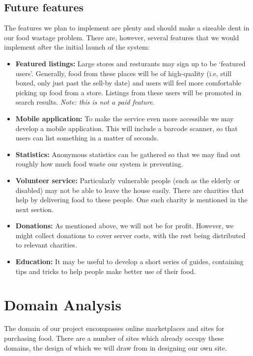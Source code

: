 \documentclass[12pt]{article}
\begin{document}
\subsection{Future features}
The features we plan to implement are plenty and should make a sizeable dent in our food wastage problem. There are, however, several features
that we would implement after the initial launch of the system:
\begin{itemize}
	\item \textbf{Featured listings:} Large stores and resturants may sign up to be `featured users'. Generally, food from these places will be of high-quality
		(i.e, still boxed, only just past the sell-by date) and users will feel more comfortable picking up food from a store. Listings from these users will
		be promoted in search results. \textit{Note: this is not a paid feature}.
	\item \textbf{Mobile application:} To make the service even more accessible we may develop a mobile application. This will include a barcode scanner, so that users
		can list something in a matter of seconds.
	\item \textbf{Statistics:} Anonymous statistics can be gathered so that we may find out roughly how much food waste our system is preventing.
	\item \textbf{Volunteer service:} Particularly vulnerable people (such as the elderly or disabled) may not be able to leave the house easily. There are charities
		that help by delivering food to these people. One such charity is mentioned in the next section.
	\item \textbf{Donations:} As mentioned above, we will not be for profit. However, we might collect donations to cover server costs, with the rest being distributed
		to relevant charities.
	\item \textbf{Education:} It may be useful to develop a short series of guides, containing tips and tricks to help people make better use of their food.
\end{itemize}


\section{Domain Analysis}

The domain of our project encompasses online marketplaces and sites for purchasing food.
There are a number of sites which already occupy these domains,
the design of which we will draw from in designing our own site.
\end{document}
